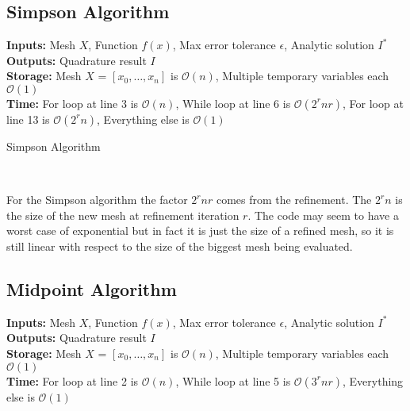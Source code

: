 \documentclass[12pt]{article}
\DeclarePairedDelimiter \abs{\lvert}{\rvert}%
\theoremstyle{remark}
\begin{document}
\newpage

\subsection{Simpson Algorithm}

\textbf{Inputs:} Mesh $X$, Function $f(x)$, Max error tolerance $\epsilon$, Analytic solution $I^*$ \\
\textbf{Outputs:} Quadrature result $I$ \\
\textbf{Storage:} Mesh $X$ = $[x_0, \dots, x_n]$ is $\mathcal{O}(n)$, Multiple temporary variables each $\mathcal{O}(1)$ \\
\textbf{Time:} For loop at line 3 is $\mathcal{O}(n)$, While loop at line 6 is $\mathcal{O}(2^{r}nr)$, For loop at line 13 is $\mathcal{O}(2^rn)$, Everything else is $\mathcal{O}(1)$

\begin{algorithm}[H]
	\caption{Simpson Algorithm}
	\begin{algorithmic}[1]
		\EndFor
		\EndFor
		\EndWhile
		\EndFor
		 \\
	\end{algorithmic}
\end{algorithm}

For the Simpson algorithm the factor $2^rnr$ comes from the refinement. The $2^rn$ is the size of the new mesh at refinement iteration $r$. The code may seem to have a worst case of exponential but in fact it is just the size of a refined mesh, so it is still linear with respect to the size of the biggest mesh being evaluated.

\newpage

\subsection{Midpoint Algorithm}

\textbf{Inputs:} Mesh $X$, Function $f(x)$, Max error tolerance $\epsilon$, Analytic solution $I^*$ \\
\textbf{Outputs:} Quadrature result $I$ \\
\textbf{Storage:} Mesh $X$ = $[x_0, \dots, x_n]$ is $\mathcal{O}(n)$, Multiple temporary variables each $\mathcal{O}(1)$ \\
\textbf{Time:} For loop at line 2 is $\mathcal{O}(n)$, While loop at line 5 is $\mathcal{O}(3^rnr)$, Everything else is $\mathcal{O}(1)$
\end{document}
